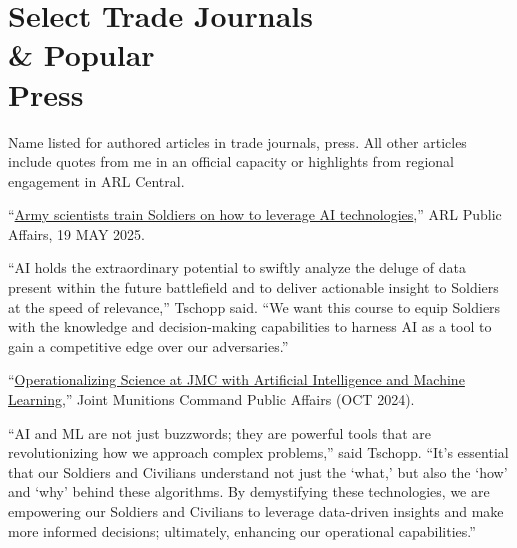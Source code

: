 \section{\sc Select Trade Journals \\ \& Popular \\ Press}

Name listed for authored articles in trade journals, press.  All other articles include quotes from me in an official capacity or highlights from regional engagement in ARL Central.

\begin{cvlist}
\setlength{\itemsep}{0in}
\setlength{\parsep}{0in} 
\setlength{\parskip}{0in}
\setlength{\topsep}{0in} 
\setlength{\partopsep}{0in} 
\setlength{\leftmargin}{0.2in}

\item ``\href{https://www.army.mil/article/285626/army_scientists_train_soldiers_on_how_to_leverage_ai_technologies}{Army scientists train Soldiers on how to leverage AI technologies},'' ARL Public Affairs, 19 MAY 2025.
\begin{list2}
\item[$\star$] ``AI holds the extraordinary potential to swiftly analyze the deluge of data present within the future battlefield and to deliver actionable insight to Soldiers at the speed of relevance,'' Tschopp said. ``We want this course to equip Soldiers with the knowledge and decision-making capabilities to harness AI as a tool to gain a competitive edge over our adversaries.''
\end{list2}

\item ``\href{https://www.dvidshub.net/news/484157/operationalizing-science-jmc-with-artificial-intelligence-and-machine-learning}{Operationalizing Science at JMC with Artificial Intelligence and Machine Learning},'' Joint Munitions Command Public Affairs (OCT 2024).
\begin{list2}
\item[$\star$] ``AI and ML are not just buzzwords; they are powerful tools that are revolutionizing how we approach complex problems,'' said Tschopp. ``It’s essential that our Soldiers and Civilians understand not just the ‘what,' but also the ‘how' and ‘why' behind these algorithms. By demystifying these technologies, we are empowering our Soldiers and Civilians to leverage data-driven insights and make more informed decisions; ultimately, enhancing our operational capabilities.''
\end{list2}


\end{cvlist}
